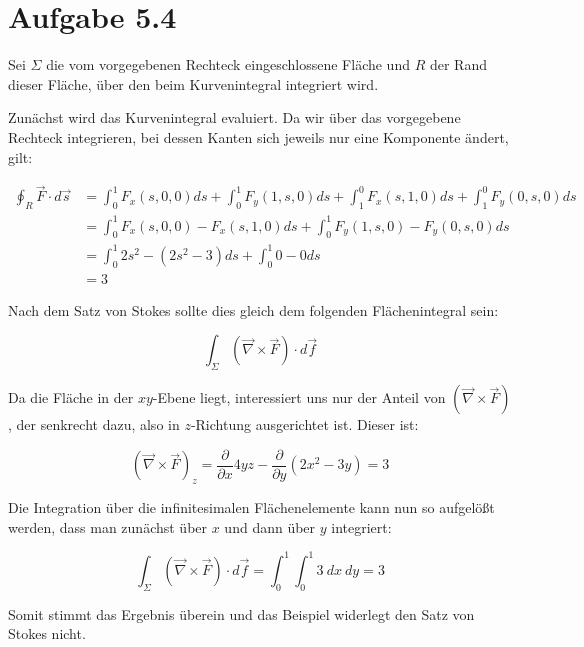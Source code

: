 \documentclass{theozettel}
\begin{document}
\section*{Aufgabe 5.4}

Sei $\Sigma$ die vom vorgegebenen Rechteck eingeschlossene Fläche und $R$ der Rand dieser Fläche, über den beim Kurvenintegral integriert wird.

Zunächst wird das Kurvenintegral evaluiert. Da wir über das vorgegebene Rechteck integrieren, bei dessen Kanten sich jeweils nur eine Komponente ändert, gilt:

\begin{align}
\oint_R \vec{F} \cdot d \vec{s} &= \int_0^{1} F_x(s,0,0) ds + \int_0^{1} F_y(1,s,0) ds + \int_1^{0} F_x(s,1,0) ds + \int_1^{0} F_y(0,s,0) ds \\
&= \int_0^{1} F_x(s,0,0) - F_x(s,1,0) ds + \int_0^{1} F_y(1,s,0) - F_y(0,s,0) ds \\
&=  \int_0^{1} 2s^{2} - (2s^{2} - 3) ds + \int_0^{1} 0-0 ds \\
&= 3
\end{align}

Nach dem Satz von Stokes sollte dies gleich dem folgenden Flächenintegral sein:

$$
\int_\Sigma (\vec{\nabla} \times \vec{F}) \cdot d \vec{f}
$$

Da die Fläche in der $xy$-Ebene liegt, interessiert uns nur der Anteil von $(\vec{\nabla} \times \vec{F})$, der senkrecht dazu, also in $z$-Richtung ausgerichtet ist. Dieser ist:

$$
(\vec{\nabla} \times \vec{F})_z = \frac{\partial}{\partial x} 4yz - \frac{\partial}{\partial y} (2x^{2} - 3y) = 3
$$

Die Integration über die infinitesimalen Flächenelemente kann nun so aufgelößt werden, dass man zunächst über $x$ und dann über $y$ integriert:

$$
\int_\Sigma (\vec{\nabla} \times \vec{F}) \cdot d \vec{f} = \int_0^{1}  \int_0^{1} 3\ dx\ dy = 3
$$

Somit stimmt das Ergebnis überein und das Beispiel widerlegt den Satz von Stokes nicht.
\end{document}

